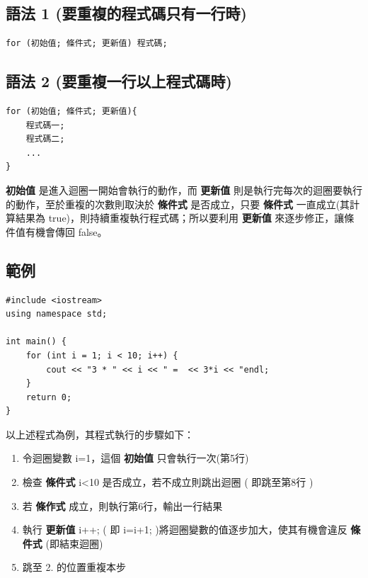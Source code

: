 \documentclass[a4paper,12pt]{article}
\begin{document}
\subsection{語法 1 (要重複的程式碼只有一行時)}
\label{sec:org9c46749}
\lstset{breaklines=true,language=cpp,label= ,caption= ,captionpos=b,firstnumber=1,numbers=left}
\begin{lstlisting}
for (初始值; 條件式; 更新值) 程式碼;
\end{lstlisting}
\subsection{語法 2 (要重複一行以上程式碼時)}
\label{sec:org141ed35}
\lstset{breaklines=true,language=cpp,label= ,caption= ,captionpos=b,firstnumber=1,numbers=left}
\begin{lstlisting}
for (初始值; 條件式; 更新值){
    程式碼一;
    程式碼二;
    ...
}
\end{lstlisting}

\textbf{初始值} 是進入迴圈一開始會執行的動作，而 \textbf{更新值} 則是執行完每次的迴圈要執行的動作，至於重複的次數則取決於 \textbf{條件式} 是否成立，只要 \textbf{條件式} 一直成立(其計算結果為 true)，則持續重複執行程式碼；所以要利用 \textbf{更新值} 來逐步修正，讓條件值有機會傳回 false。\\
\subsection{範例}
\label{sec:org9f53273}
\lstset{breaklines=true,language=cpp,label= ,caption= ,captionpos=b,firstnumber=1,numbers=left}
\begin{lstlisting}
#include <iostream>
using namespace std;

int main() {
    for (int i = 1; i < 10; i++) {
        cout << "3 * " << i << " =  << 3*i << "endl;
    }
    return 0;
}
\end{lstlisting}

以上述程式為例，其程式執行的步驟如下：\\
\begin{enumerate}
\item 令迴圈變數 i=1，這個 \textbf{初始值} 只會執行一次(第5行)\\
\item 檢查 \textbf{條件式} i<10 是否成立，若不成立則跳出迴圈 ( 即跳至第8行 )\\
\item 若 \textbf{條作式} 成立，則執行第6行，輸出一行結果\\
\item 執行 \textbf{更新值} i++; ( 即 i=i+1; )將迴圈變數的值逐步加大，使其有機會違反 \textbf{條件式} (即結束迴圈)\\
\item 跳至 2. 的位置重複本步\\
\end{enumerate}
\end{document}
